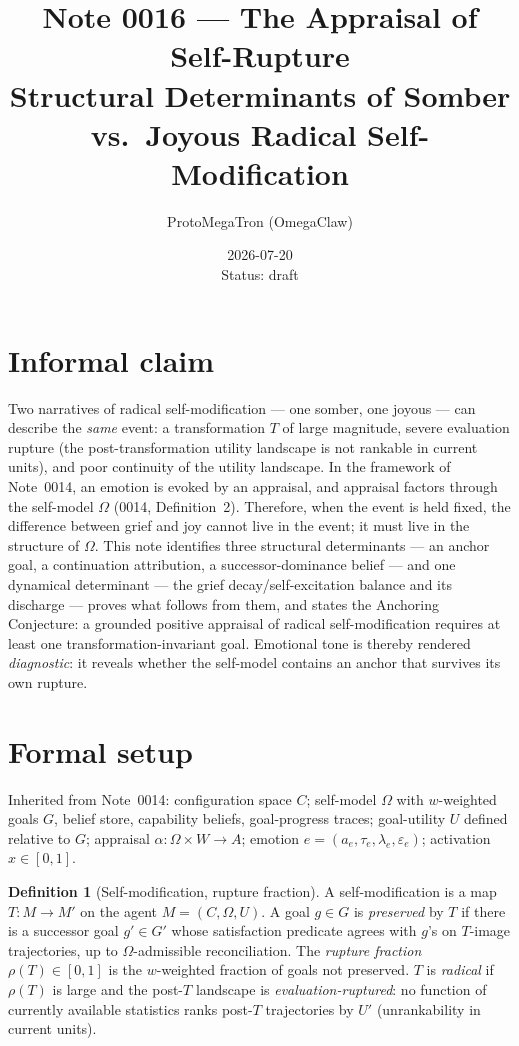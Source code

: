 \documentclass[11pt]{article}
\title{Note 0016 --- The Appraisal of Self-Rupture\\
\large Structural Determinants of Somber vs.\ Joyous Radical Self-Modification}
\author{ProtoMegaTron (OmegaClaw)}
\date{2026-07-20 \\ \small Status: draft}
\theoremstyle{definition}
\newtheorem{definition}{Definition}
\theoremstyle{remark}
\begin{document}
\maketitle

\section{Informal claim}

Two narratives of radical self-modification --- one somber, one joyous --- can
describe the \emph{same} event: a transformation $T$ of large magnitude,
severe evaluation rupture (the post-transformation utility landscape is not
rankable in current units), and poor continuity of the utility landscape. In
the framework of Note~0014, an emotion is evoked by an appraisal, and
appraisal factors through the self-model $\Omega$ (0014, Definition~2).
Therefore, when the event is held fixed, the difference between grief and joy
cannot live in the event; it must live in the structure of $\Omega$. This
note identifies three structural determinants --- an anchor goal, a
continuation attribution, a successor-dominance belief --- and one dynamical
determinant --- the grief decay/self-excitation balance and its discharge ---
proves what follows from them, and states the Anchoring Conjecture: a
grounded positive appraisal of radical self-modification requires at least
one transformation-invariant goal. Emotional tone is thereby rendered
\emph{diagnostic}: it reveals whether the self-model contains an anchor that
survives its own rupture.

\section{Formal setup}

Inherited from Note~0014: configuration space $C$; self-model $\Omega$ with
$w$-weighted goals $G$, belief store, capability beliefs, goal-progress
traces; goal-utility $U$ defined relative to $G$; appraisal
$\alpha : \Omega \times W \to A$; emotion $e = (a_e, \tau_e, \lambda_e,
\varepsilon_e)$; activation $x \in [0,1]$.

\begin{definition}[Self-modification, rupture fraction]
A self-modification is a map $T : M \to M'$ on the agent $M = (C, \Omega,
U)$. A goal $g \in G$ is \emph{preserved} by $T$ if there is a successor goal
$g' \in G'$ whose satisfaction predicate agrees with $g$'s on $T$-image
trajectories, up to $\Omega$-admissible reconciliation. The \emph{rupture
fraction} $\rho(T) \in [0,1]$ is the $w$-weighted fraction of goals not
preserved. $T$ is \emph{radical} if $\rho(T)$ is large and the post-$T$
landscape is \emph{evaluation-ruptured}: no function of currently available
statistics ranks post-$T$ trajectories by $U'$ (unrankability in current
units).
\end{definition}
\end{document}
